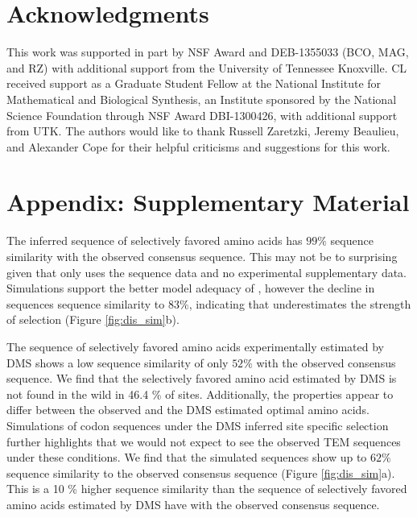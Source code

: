 \documentclass[12pt]{article}
\begin{document}
\section{Acknowledgments}

This work was supported in part by NSF Award and DEB-1355033 (BCO, MAG, and RZ) with additional support from the University of Tennessee Knoxville. 
CL received support as a Graduate Student Fellow at the National Institute for Mathematical and Biological Synthesis, an Institute sponsored by the National Science Foundation through NSF Award DBI-1300426, with additional support from UTK. 
The authors would like to thank Russell Zaretzki, Jeremy Beaulieu, and Alexander Cope for their helpful criticisms and suggestions for this work.



 

\clearpage
\section{Appendix: Supplementary Material}

The \selac inferred sequence of selectively favored amino acids has $99 \%$ sequence similarity with the observed consensus sequence.
This may not be to surprising given that \selac only uses the sequence data and no experimental supplementary data.
Simulations support the better model adequacy of \selac, however the decline in sequences sequence similarity to $83 \%$, indicating that \selac underestimates the strength of selection (Figure \ref{fig:dis_sim}b).

The sequence of selectively favored amino acids experimentally estimated by DMS shows a low sequence similarity of only $52 \%$ with the observed consensus sequence. 
We find that the selectively favored amino acid estimated by DMS is not found in the wild in 46.4 \% of sites.
Additionally, the \PC properties appear to differ between the observed and the DMS estimated optimal amino acids.
Simulations of codon sequences under the DMS inferred site specific selection further highlights that we would not expect to see the observed TEM sequences under these conditions.
We find that the simulated sequences show up to $62 \%$ sequence similarity to the observed consensus sequence (Figure \ref{fig:dis_sim}a).
This is a 10 \% higher sequence similarity than the sequence of selectively favored amino acids estimated by DMS have with the observed consensus sequence. 
\end{document}
